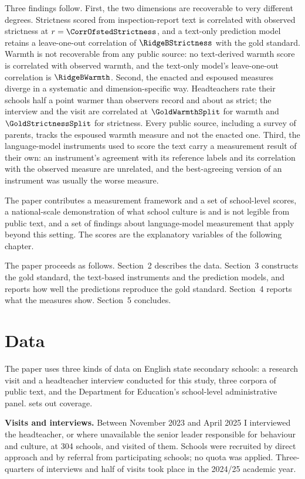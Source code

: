 Three findings follow. First, the two dimensions are recoverable to very
different degrees. Strictness scored from inspection-report text is
correlated with observed strictness at $r = \CorrOfstedStrictness$, and a
text-only prediction model retains a leave-one-out correlation of
$\RidgeBStrictness$ with the gold standard. Warmth is not recoverable from
any public source: no text-derived warmth score is correlated with observed
warmth, and the text-only model's leave-one-out correlation is
$\RidgeBWarmth$. Second, the enacted and espoused measures diverge in a
systematic and dimension-specific way. Headteachers rate their schools half a
point warmer than observers record and about as strict; the interview and
the visit are correlated at $\GoldWarmthSplit$ for warmth and
$\GoldStrictnessSplit$ for strictness. Every public source, including a
survey of parents, tracks the espoused warmth measure and not the enacted one.
Third, the language-model instruments used to score the text carry a
measurement result of their own: an instrument's agreement with its reference
labels and its correlation with the observed measure are unrelated, and the
best-agreeing version of an instrument was usually the worse measure.

The paper contributes a measurement framework and a set of school-level
scores, a national-scale demonstration of what school culture is and is not
legible from public text, and a set of findings about language-model
measurement that apply beyond this setting. The scores are the explanatory
variables of the following chapter.

The paper proceeds as follows. Section~2 describes the data. Section~3
constructs the gold standard, the text-based instruments and the prediction
models, and reports how well the predictions reproduce the gold standard.
Section~4 reports what the measures show. Section~5 concludes.

\section{Data}
\label{sec:p1_data}

The paper uses three kinds of data on English state secondary schools: a
research visit and a headteacher interview conducted for this study, three
corpora of public text, and the Department for Education's school-level
administrative panel.  sets out coverage.

\textbf{Visits and interviews.} Between November 2023 and April 2025 I
interviewed the headteacher, or where unavailable the senior leader
responsible for behaviour and culture, at 304 schools, and visited
\NTierOne{} of them. Schools were recruited by direct approach and by
referral from participating schools; no quota was applied. Three-quarters of
interviews and half of visits took place in the 2024/25 academic year.

